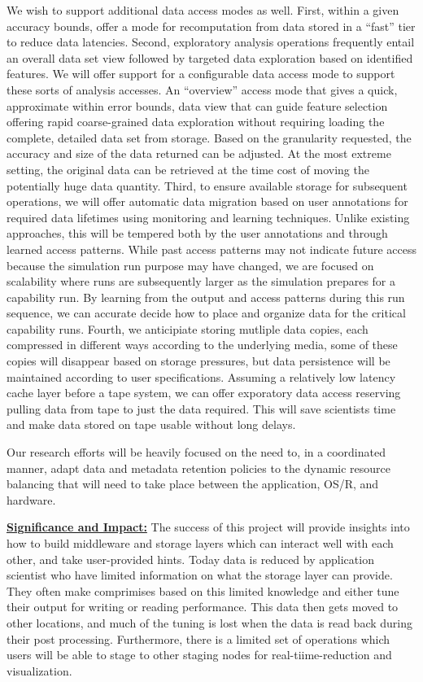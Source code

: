 \documentclass[11pt,letterpaper]{article}
\begin{document}
We wish to support additional data access modes as well. First, within a given
accuracy bounds, offer a mode for recomputation from data stored in a ``fast''
tier to reduce data latencies. Second, exploratory analysis operations
frequently entail an overall data set view followed by targeted data
exploration based on identified features. We will offer support for a
configurable data access mode to support these sorts of analysis accesses. An
``overview'' access mode that gives a quick, approximate within error bounds,
data view that can guide feature selection offering rapid coarse-grained data
exploration without requiring loading the complete, detailed data set from
storage. Based on the granularity requested, the accuracy and size of the data
returned can be adjusted. At the most extreme setting, the original data can
be retrieved at the time cost of moving the potentially huge data quantity.
Third, to ensure available storage for subsequent operations, we will offer
automatic data migration based on user annotations for required data lifetimes
using monitoring and learning techniques. Unlike existing approaches, this will
be tempered both by the user annotations and through learned access patterns.
While past access patterns may not indicate future access because the
simulation run purpose may have changed, we are focused on scalability where
runs are subsequently larger as the simulation prepares for a capability run.
By learning from the output and access patterns during this run sequence, we
can accurate decide how to place and organize data for the critical capability
runs. Fourth, we anticipiate storing mutliple data copies, each compressed in
different ways according to the underlying media, some of these copies will
disappear based on storage pressures, but data persistence will be maintained
according to user specifications. Assuming a relatively low latency cache layer
before a tape system, we can offer exporatory data access reserving pulling
data from tape to just the data required. This will save scientists time and
make data stored on tape usable without long delays.

Our research efforts will be heavily focused on the need to, in a coordinated
manner, adapt data and metadata retention policies to the dynamic
resource balancing that will need to take place between the application,
OS/R, and hardware.

\underline{\textbf{Significance and Impact:}}
The success of this project will  provide insights into how to build middleware and storage layers which can interact
well with each other, and take user-provided hints. Today data is reduced by application scientist who have 
limited information on what the storage layer can provide. They often make comprimises based on this limited knowledge
and either tune their output for writing or reading performance. This data then gets moved to other locations, and much of
the tuning is lost when the data is read back during their post processing. Furthermore, there is a limited set of operations
which users will be able to stage to other staging nodes for real-tiime-reduction and visualization. 
\end{document}
